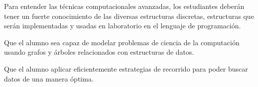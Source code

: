 \begin{syllabus}


\begin{justification}
Para entender las técnicas computacionales avanzadas, los estudiantes deberán tener un fuerte conocimiento de las
diversas estructuras discretas, estructuras que serán implementadas y usadas en laboratorio en el lenguaje de programación.
\end{justification}

\begin{goals}
\item Que el alumno sea capaz de modelar problemas de ciencia de la computación usando grafos y árboles relacionados con estructuras de datos.
\item Que el alumno aplicar eficientemente estrategias de recorrido para poder buscar datos de una manera óptima.
\end{goals}

\begin{outcomes}
    \item {} %
    \item {} %
    \item {} %
    \item {} %
\end{outcomes}

\begin{competences}
    \item {} %
    \item {}
    \item {} %
    \item {} %
    \item {} %
    \item {} %
\end{competences}


\end{syllabus}
